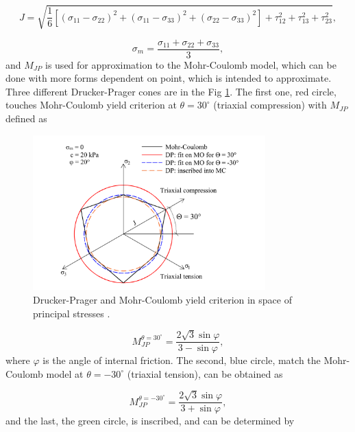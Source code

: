 \begin{equation}\label{eq:f_J_sigM}
	J = \sqrt{\dfrac{1}{6} \left[(\sigma_{11}-\sigma_{22})^{2} + (\sigma_{11}-\sigma_{33})^{2} + (\sigma_{22}-\sigma_{33})^{2}\right] + \tau_{12}^{2} + \tau_{13}^{2}+ \tau_{23}^{2}},
\end{equation}


\begin{equation}\label{eq:f_sigM}
	\sigma_m = \dfrac{\sigma_{11} + \sigma_{22} + \sigma_{33}}{3},
\end{equation}
and $M_{JP}$ is used for approximation to the Mohr-Coulomb model, which can be done with more forms dependent on point, which is intended to approximate. Three different Drucker-Prager cones are in the Fig \ref{obr:F1}. The first one, red circle, touches Mohr-Coulomb yield criterion at $\theta = 30^\circ$ (triaxial compression) with $M_{JP}$ defined as

\begin{figure}[h!]
	\centering	
	\includegraphics[width=0.8\textwidth, angle=0]{obrazky/drucker-prager_eng.png}
	\caption[Drucker-Prager and Mohr-Coulomb model]{Drucker-Prager and Mohr-Coulomb yield criterion in space of principal stresses \cite{geofem}. \label{obr:F1}}
\end{figure}



\begin{equation}\label{eq:f_Mjp_30}
	M_{JP}^{\theta=30^\circ} = \dfrac{2\sqrt{3}\sin\varphi}{3-\sin \varphi},
\end{equation}
where $\varphi$ is the angle of internal friction. The second, blue circle, match the Mohr-Coulomb model at  $\theta = -30^\circ$ (triaxial tension), can be obtained as

\begin{equation}\label{eq:f_Mjp_-30}
	M_{JP}^{\theta=-30^\circ} = \dfrac{2\sqrt{3}\sin\varphi}{3+\sin \varphi},
\end{equation}
and the last, the green circle, is inscribed, and can be determined by

